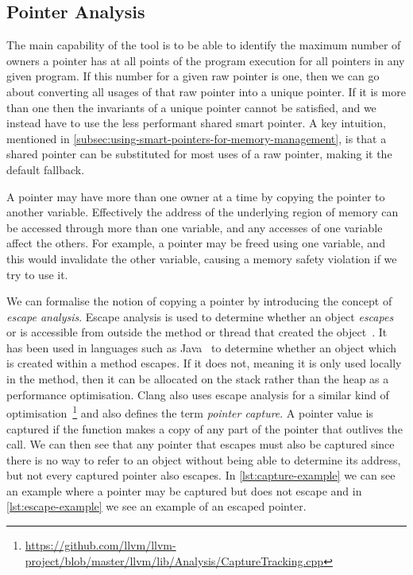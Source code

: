 \documentclass{proposal}
\begin{document}
    \subsection{Pointer Analysis}\label{subsec:pointer-analysis}

    The main capability of the tool is to be able to identify the maximum number of owners a pointer has at all points of the program execution for all pointers in any given program.
    If this number for a given raw pointer is one, then we can go about converting all usages of that raw pointer into a unique pointer.
    If it is more than one then the invariants of a unique pointer cannot be satisfied, and we instead have to use the less performant shared smart pointer.
    A key intuition, mentioned in \autoref{subsec:using-smart-pointers-for-memory-management}, is that a shared pointer can be substituted for most uses of a raw pointer, making it the default fallback.

    A pointer may have more than one owner at a time by copying the pointer to another variable.
    Effectively the address of the underlying region of memory can be accessed through more than one variable, and any accesses of one variable affect the others.
    For example, a pointer may be freed using one variable, and this would invalidate the other variable, causing a memory safety violation if we try to use it.

    We can formalise the notion of copying a pointer by introducing the concept of \emph{escape analysis}.
    Escape analysis is used to determine whether an object \emph{escapes} or is accessible from outside the method or thread that created the object~\cite{Choi1999}.
    It has been used in languages such as Java~\cite{Choi1999} to determine whether an object which is created within a method escapes.
    If it does not, meaning it is only used locally in the method, then it can be allocated on the stack rather than the heap as a performance optimisation.
    Clang also uses escape analysis for a similar kind of optimisation~\footnote{\url{https://github.com/llvm/llvm-project/blob/master/llvm/lib/Analysis/CaptureTracking.cpp}} and also defines the term \emph{pointer capture}.
    A pointer value is captured if the function makes a copy of any part of the pointer that outlives the call.
    We can then see that any pointer that escapes must also be captured since there is no way to refer to an object without being able to determine its address, but not every captured pointer also escapes.
    In \autoref{lst:capture-example} we can see an example where a pointer may be captured but does not escape and in \autoref{lst:escape-example} we see an example of an escaped pointer.
\end{document}
